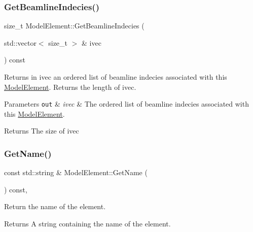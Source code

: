 \mbox{\label{classModelElement_a97fe4db8a9b82b5778e4286044ccacf8}} 
\subsubsection{\texorpdfstring{Get\+Beamline\+Indecies()}{GetBeamlineIndecies()}}
{\footnotesize\ttfamily size\+\_\+t Model\+Element\+::\+Get\+Beamline\+Indecies (\begin{DoxyParamCaption}\item[{std\+::vector$<$ size\+\_\+t $>$ \&}]{ivec }\end{DoxyParamCaption}) const\hspace{0.3cm}{\ttfamily [inline]}}

Returns in ivec an ordered list of beamline indecies associated with this \hyperlink{classModelElement}{Model\+Element}. Returns the length of ivec. 
\begin{DoxyParams}[1]{Parameters}
\mbox{\tt out}  & {\em ivec} & The ordered list of beamline indecies associated with this \hyperlink{classModelElement}{Model\+Element}. \\
\hline
\end{DoxyParams}
\begin{DoxyReturn}{Returns}
The size of ivec 
\end{DoxyReturn}
\mbox{\label{classModelElement_ae2bb7fbbbde063a49a02ea6fe22d92c4}} 
\subsubsection{\texorpdfstring{Get\+Name()}{GetName()}}
{\footnotesize\ttfamily const std\+::string \& Model\+Element\+::\+Get\+Name (\begin{DoxyParamCaption}{ }\end{DoxyParamCaption}) const\hspace{0.3cm}{\ttfamily [inline]}, {\ttfamily [virtual]}}

Return the name of the element. \begin{DoxyReturn}{Returns}
A string containing the name of the element. 
\end{DoxyReturn}



